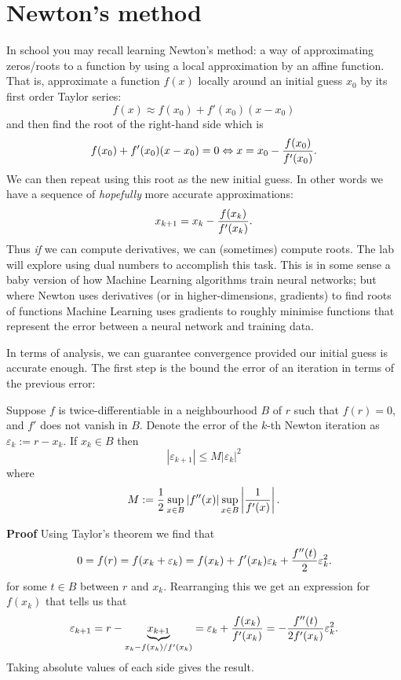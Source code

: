 
\section{Newton's method}
In school you may recall learning Newton's method: a way of approximating zeros/roots to a function by using a local approximation by an affine function. That is, approximate a function $f(x)$ locally around an initial guess $x_0$ by its first order Taylor series:
\[
f(x) \ensuremath{\approx} f(x_0) + f'(x_0) (x-x_0)
\]
and then find the root of the right-hand side which is
\[
 f(x_0) + f'(x_0) (x-x_0) = 0 \ensuremath{\Leftrightarrow} x = x_0 - {f(x_0) \over f'(x_0)}.
\]
We can then repeat using this root as the new initial guess. In other words we have a sequence of \emph{hopefully} more accurate approximations:
\[
x_{k+1} = x_k - {f(x_k) \over f'(x_k)}.
\]
Thus \emph{if} we can compute derivatives, we can (sometimes) compute roots. The lab will explore using dual numbers to accomplish this task. This is in some sense a baby version of how Machine Learning algorithms train neural networks; but where Newton uses derivatives (or in higher-dimensions, gradients) to find roots of functions Machine Learning uses gradients to roughly minimise functions that represent the error between a neural network and training data.

In terms of analysis, we can guarantee convergence provided our initial guess is accurate enough. The first step is the bound the error of an iteration in terms of the previous error:

\begin{theorem} Suppose $f$ is twice-differentiable in a neighbourhood $B$ of $r$  such that $f(r) = 0$, and $f'$ does not vanish in $B$. Denote the error of the $k$-th Newton iteration as $\ensuremath{\varepsilon}_k := r - x_k$. If $x_k \ensuremath{\in} B$ then
\[
|\ensuremath{\varepsilon}_{k+1}| \ensuremath{\leq} M |\ensuremath{\varepsilon}_k|^2
\]
where
\[
M := {1 \over 2} \sup_{x \ensuremath{\in} B}  | f''(x)|   \sup_{x \ensuremath{\in} B} \left| {1 \over f'(x)} \right|.
\]
\end{theorem}
\textbf{Proof} Using Taylor's theorem we find that
\[
0 = f(r) = f(x_k + \ensuremath{\varepsilon}_k) = f(x_k) + f'(x_k) \ensuremath{\varepsilon}_k + {f''(t) \over 2} \ensuremath{\varepsilon}_k^2.
\]
for some $t \ensuremath{\in} B$ between $r$ and $x_k$.  Rearranging this we get an expression for $f(x_k)$ that tells us that
\[
\ensuremath{\varepsilon}_{k+1} = r - \underbrace{x_{k+1}}_{x_k - f(x_k)/f'(x_k)} = \ensuremath{\varepsilon}_k +  {f(x_k) \over f'(x_k)} = -{f''(t) \over 2f'(x_k)} \ensuremath{\varepsilon}_k^2.
\]
Taking absolute values of each side gives the result.

